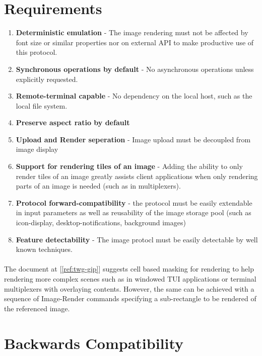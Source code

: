 \documentclass[a4paper]{article}
\begin{document}
\section{Requirements} %

\begin{enumerate}
    \item \textbf{Deterministic emulation} - The image rendering must not be affected by font size
        or similar properties nor on external API to make productive use of this protocol.
    \item \textbf{Synchronous operations by default} - No asynchronous operations unless explicitly requested.
    \item \textbf{Remote-terminal capable} - No dependency on the local host, such as the local file system.
    \item \textbf{Preserve aspect ratio by default}
    \item \textbf{Upload and Render seperation} - Image upload must be decoupled from image display
    \item \textbf{Support for rendering tiles of an image} - Adding the ability to only render tiles
        of an image greatly assists client applications when only rendering parts of an image is
        needed (such as in multiplexers).
    \item \textbf{Protocol forward-compatibility} - the protocol must be easily extendable in input
        parameters as well as reusability of the image storage pool
        (such as icon-display, desktop-notifications, background images)
    \item \textbf{Feature detectability} - The image protocl must be easily detectable by well known techniques.
\end{enumerate}

\paragraph*{}

The document at [\ref{ref:twg-gip}] suggests cell based masking for rendering to help rendering more
complex scenes such as in windowed TUI applications or terminal multiplexers with overlaying contents.
However, the same can be achieved with a sequence of Image-Render commands specifying a
sub-rectangle to be rendered of the referenced image.

\section{Backwards Compatibility} %
\end{document}
